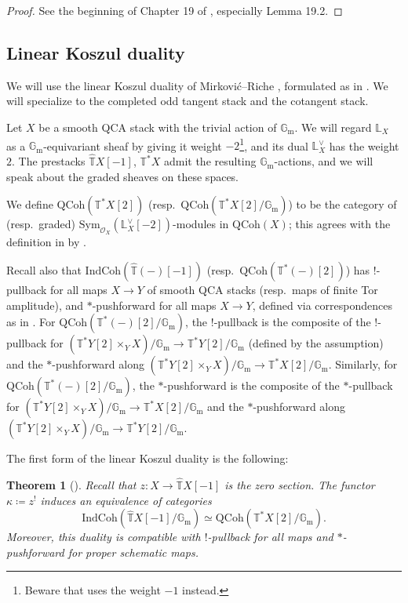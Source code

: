 \documentclass{amsart}
\newtheorem{theorem}{Theorem}[subsection]
\theoremstyle{definition}
\theoremstyle{remark}
\numberwithin{equation}{section}
\newcommand{\bb}{\mathbb}
\newcommand{\Gm}{{\mathbb{G}_{\mathrm{m}}}}
\newcommand{\wh}{\widehat}
\newcommand{\Sym}{\mathrm{Sym}}
\newcommand{\IndCoh}{\mathrm{IndCoh}}
\newcommand{\QCoh}{\mathrm{QCoh}}
\newcommand{\T}{\mathbb{T}}
\renewcommand{\L}{\mathbb{L}}
\begin{document}
\begin{proof}
See the beginning of Chapter 19 of \cite{ABV}, especially Lemma 19.2.
\end{proof}


\subsection{Linear Koszul duality}{\label{ss: koszuloddtangent}}
We will use the linear Koszul duality of Mirkovi\'c--Riche \cite{MRI, MRII, MRIwahoriMatsumoto}, formulated as in \cite{Chen2023categorical}. We will specialize to the completed odd tangent stack and the cotangent stack.  

Let $X$ be a smooth QCA stack with the trivial action of $\Gm$. We will regard $\L_X$ as a $\Gm$-equivariant sheaf by giving it weight $-2$\footnote{Beware that \cite{Chen2023categorical} uses the weight $-1$ instead.}, and its dual $\L_X^\vee$ has the weight $2$. The prestacks $\wh{\T}X[-1]$, $\T^\ast X$ admit the resulting $\Gm$-actions, and we will speak about the graded sheaves on these spaces. 

We define $\QCoh(\T^\ast X[2])$ (resp.~$\QCoh(\T^\ast X[2]/\Gm)$) to be the category of (resp.~graded) $\Sym_{\mathcal{O}_X} (\L_X^\vee[-2])$-modules in $\QCoh(X)$; this agrees with the definition in \cite{Chen2023categorical} by \cite[Proposition 2.1.11]{Chen2023categorical}. 

Recall also that $\IndCoh(\wh{\T}(-)[-1])$ (resp.~$\QCoh(\T^\ast (-)[2])$) has $!$-pullback for all maps $X\to Y$ of smooth QCA stacks (resp.~maps of finite Tor amplitude), and $*$-pushforward for all maps $X\to Y$, defined via correspondences as in \cite[Definition 2.3.1]{Chen2023categorical}. For $\QCoh (\bb T^*(-)[2]/ \Gm)$, the $!$-pullback is the composite of the $!$-pullback for $(\bb T^* Y[2]\times_Y X) / \Gm\to \bb T^* Y[2]/ \Gm$ (defined by the assumption) and the $*$-pushforward along $(\bb T^* Y[2]\times_Y X)/ \Gm \to \bb T^* X[2]/ \Gm$. Similarly, for $\QCoh (\bb T^*(-)[2]/ \Gm)$, the $*$-pushforward is the composite of the $*$-pullback for $(\bb T^* Y[2]\times_Y X) / \Gm\to \bb T^* X[2]/ \Gm$ and the $*$-pushforward along $(\bb T^* Y[2]\times_Y X) / \Gm\to \bb T^* Y[2]/ \Gm$. 

The first form of the linear Koszul duality is the following:

\begin{theorem}[{\cite[Theorems 2.1.19, 2.3.6]{Chen2023categorical}}]{\label{thm: gradedkoszulduality}}
Recall that $z\colon X\to \wh{\T}X[-1]$ is the zero section. The functor $\kappa\coloneq z^!$ induces an equivalence of categories
\begin{equation*}
        \IndCoh(\wh{\T}X[-1] / \Gm) \simeq  \QCoh(\T^{\ast}X [2]/ \Gm). 
\end{equation*}
Moreover, this duality is compatible with $!$-pullback for all maps and $*$-pushforward for proper schematic maps. 
\end{theorem}
\end{document}
